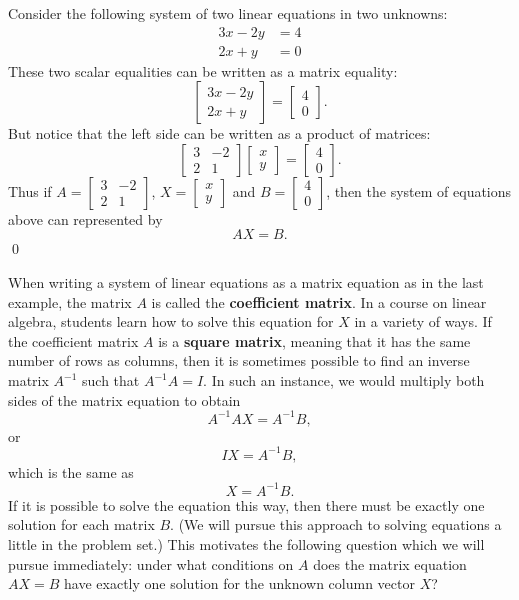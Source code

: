 \documentclass[12pt,letterpaper,twoside]{amsart}
\newcounter{example}
\newcounter{problem}
\newcommand{\example}{\bigskip \noindent {\large {\sc Example \arabic{example}:}} \addtocounter{example}{1}}
\begin{document}
\example Consider the following system of two linear equations in two unknowns:
\begin{align*} 3x-2y & = 4 \\ 2x+y & = 0 \end{align*}
These two scalar equalities can be written as a matrix equality:
\[ \left[ \begin{matrix} 3x-2y \\ 2x+y \end{matrix} \right] = \left[ \begin{matrix} 4 \\ 0 \end{matrix} \right].\]
But notice that the left side can be written as a product of matrices:
\[ \left[ \begin{matrix} 3 & -2 \\ 2 & 1 \end{matrix} \right] \left[ \begin{matrix} x \\ y \end{matrix} \right] = \left[ \begin{matrix} 4 \\ 0 \end{matrix} \right].\]
Thus if $A=\left[ \begin{matrix} 3 & -2 \\ 2 & 1 \end{matrix} \right]$, $X=\left[ \begin{matrix} x \\ y \end{matrix} \right]$ and $B=\left[ \begin{matrix} 4 \\ 0 \end{matrix} \right]$, then the system of equations above can represented by 
\[ AX=B.\]
\qed

When writing a system of linear equations as a matrix equation as in the last example, the matrix $A$ is called the {\bf coefficient matrix}.  In a course on linear algebra, students learn how to solve this equation for $X$ in a variety of ways.  If the coefficient matrix $A$ is a {\bf square matrix}, meaning that it has the same number of rows as columns, then it is sometimes possible to find an inverse matrix $A^{-1}$ such that $A^{-1}A=I$.  In such an instance, we would multiply both sides of the matrix equation to obtain
\[ A^{-1} A X = A^{-1} B,\]
or 
\[ IX = A^{-1}B,\]
which is the same as
\[ X = A^{-1}B.\]
If it is possible to solve the equation this way, then there must be exactly one solution for each matrix $B$.  (We will pursue this approach to solving equations a little in the problem set.)  This motivates the following question which we will pursue immediately: under what conditions on $A$ does the matrix equation $AX=B$ have exactly one solution for the unknown column vector $X$?
\end{document}
